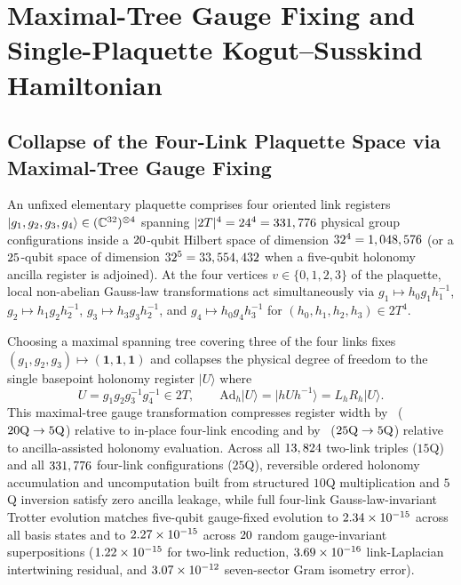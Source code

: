 \documentclass[aps,prx,twocolumn,superscriptaddress,nofootinbib]{revtex4-2}
\begin{document}
\section{Maximal-Tree Gauge Fixing and Single-Plaquette Kogut--Susskind Hamiltonian}

\subsection{Collapse of the Four-Link Plaquette Space via Maximal-Tree Gauge Fixing}

An unfixed elementary plaquette comprises four oriented link registers $|g_1, g_2, g_3, g_4\rangle \in (\mathbb{C}^{32})^{\otimes 4}$ spanning $|2T|^4 = 24^4 = 331,776$ physical group configurations inside a $20$-qubit Hilbert space of dimension $32^4 = 1,048,576$ (or a $25$-qubit space of dimension $32^5 = 33,554,432$ when a five-qubit holonomy ancilla register is adjoined). At the four vertices $v \in \{0,1,2,3\}$ of the plaquette, local non-abelian Gauss-law transformations act simultaneously via $g_1 \mapsto h_0 g_1 h_1^{-1}$, $g_2 \mapsto h_1 g_2 h_2^{-1}$, $g_3 \mapsto h_3 g_3 h_2^{-1}$, and $g_4 \mapsto h_0 g_4 h_3^{-1}$ for $(h_0,h_1,h_2,h_3) \in 2T^4$.

Choosing a maximal spanning tree covering three of the four links fixes $(g_1, g_2, g_3) \mapsto (\mathbf{1}, \mathbf{1}, \mathbf{1})$ and collapses the physical degree of freedom to the single basepoint holonomy register $|U\rangle$ where
\begin{equation}
\label{eq:plaquette_holonomy}
U = g_1 g_2 g_3^{-1} g_4^{-1} \in 2T, \qquad \mathrm{Ad}_h |U\rangle = |h U h^{-1}\rangle = L_h R_h |U\rangle.
\end{equation}
This maximal-tree gauge transformation compresses register width by \BTPlaqQubitReductionInplace\ ($20\mathrm{Q} \to 5\mathrm{Q}$) relative to in-place four-link encoding and by \BTPlaqQubitReductionAncilla\ ($25\mathrm{Q} \to 5\mathrm{Q}$) relative to ancilla-assisted holonomy evaluation. Across all $13,824$ two-link triples ($15$Q) and all $331,776$ four-link configurations ($25$Q), reversible ordered holonomy accumulation and uncomputation built from structured $10$Q multiplication and $5$Q inversion satisfy zero ancilla leakage, while full four-link Gauss-law-invariant Trotter evolution matches five-qubit gauge-fixed evolution to $2.34 \times 10^{-15}$ across all basis states and to $2.27 \times 10^{-15}$ across $20$ random gauge-invariant superpositions ($1.22 \times 10^{-15}$ for two-link reduction, $3.69 \times 10^{-16}$ link-Laplacian intertwining residual, and $3.07 \times 10^{-12}$ seven-sector Gram isometry error).
\end{document}
